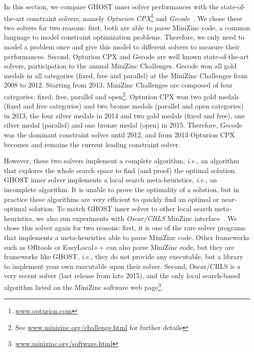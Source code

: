 \documentclass[journal]{IEEEtran}
\newcommand{\ghost}{\textsc{GHOST}\xspace}
\newcommand{\ie}{\textit{i.e.}}
\begin{document}
In this section, we compare  \ghost inner solver performances with the
state-of-the-art  constraint solvers,  namely {\it  Opturion CPX}\footnote{\href{http://www.opturion.com}{www.opturion.com}}  and
{\it Gecode}~\cite{gecode}.  We chose these  two solvers  for two reasons:  first, both
are able to parse MiniZinc code, a common language to model constraint
optimization problems. Therefore, we only need to model a problem once
and  give   this  model   to  different   solvers  to   measure  their
performances.   Second,   Opturion   CPX   and  Gecode   are   well   known
state-of-the-art  solvers,   participation  to  the   annual  MiniZinc
Challenges.   Gecode won  all gold  medals in  all categories  (fixed,
free and parallel) at the
MiniZinc Challenges from  2008 to 2012.  Starting  from 2013, MiniZinc
Challenges are composed of four  categories: fixed, free, parallel and
open\footnote{See
  \href{http://www.minizinc.org/challenge.html}{www.minizinc.org/challenge.html}
  for further details}. Opturion CPX won two gold
medals (fixed  and free  categories) and  two bronze  medals (parallel
and open categories)  in 2013, the four silver medals  in 2014 and two
gold  medals (fixed  and free),  one silver  medal (parallel)  and one
bronze  medal  (open) in  2015.  Therefore,  Gecode was  the  dominant
constraint solver until  2012, and from 2013 Opturion  CPX becomes and
remains the current leading constraint solver.

However, these  two solvers implement  a complete algorithm,  \ie, an
algorithm that explores  the whole  search space to  find (and  proof) the
optimal  solution.   \ghost inner  solver  implements  a local  search
meta-heuristics, \ie, an  incomplete algorithm. It is  unable to prove
the optimality  of a  solution, but in  practice these  algorithms are
very efficient to quickly find an optimal or near-optimal solution. To
match \ghost inner solver to other local search meta-heuristics, we
also run experiments  with {\it  Oscar/CBLS} MinZinc interface~\cite{oscar}.   We chose
this solver  again for two  reasons: first, it is  one of the  rare solver
programs that implements   a  meta-heuristics  able  to   parse  MiniZinc
code. Other frameworks such as  ORtools or EasyLocal++ can also parse
MiniZinc code,  but they are frameworks like  \ghost, \ie, they  do not
provide  any   executable,  but a library  to   implement  your  own
executable upon their solver.
Second, Oscar/CBLS is  a very recent
solver (last release from late  2015), and the only local search-based
algorithm     listed     on      the     MiniZinc     software     web
page\footnote{\href{http://www.minizinc.org/software.html}{www.minizinc.org/software.html}}.
\end{document}
